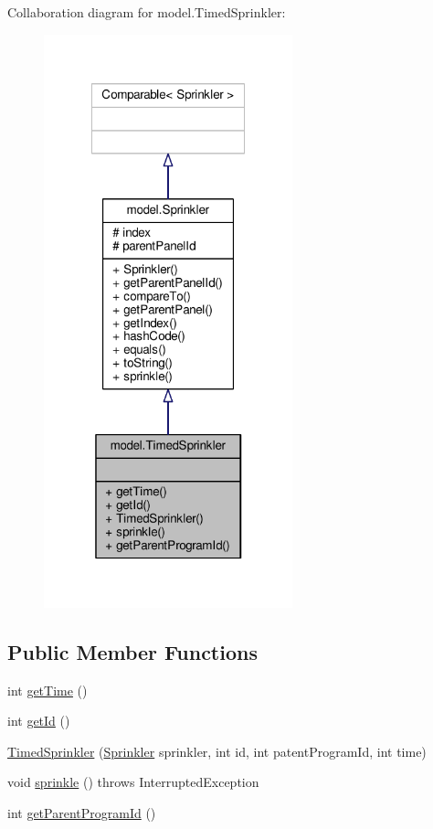 Collaboration diagram for model.\-Timed\-Sprinkler\-:\nopagebreak
\begin{figure}[H]
\begin{center}
\leavevmode
\includegraphics[width=204pt]{classmodel_1_1TimedSprinkler__coll__graph}
\end{center}
\end{figure}
\subsection*{Public Member Functions}
\begin{DoxyCompactItemize}
\item 
int \hyperlink{classmodel_1_1TimedSprinkler_ab0ba114252c55ec7995d58376750485a}{get\-Time} ()
\item 
int \hyperlink{classmodel_1_1TimedSprinkler_aaf2924a2f3e51954bcbdf2221ca6a4aa}{get\-Id} ()
\item 
\hyperlink{classmodel_1_1TimedSprinkler_ae55b6aac3c65f6962911ef91bf3d8aee}{Timed\-Sprinkler} (\hyperlink{classmodel_1_1Sprinkler}{Sprinkler} sprinkler, int id, int patent\-Program\-Id, int time)
\item 
void \hyperlink{classmodel_1_1TimedSprinkler_a2c48212b71d77beff3442ed76fede2d9}{sprinkle} ()  throws Interrupted\-Exception 
\item 
int \hyperlink{classmodel_1_1TimedSprinkler_a497ab6c4dd45f3d217084745d988d901}{get\-Parent\-Program\-Id} ()
\end{DoxyCompactItemize}
